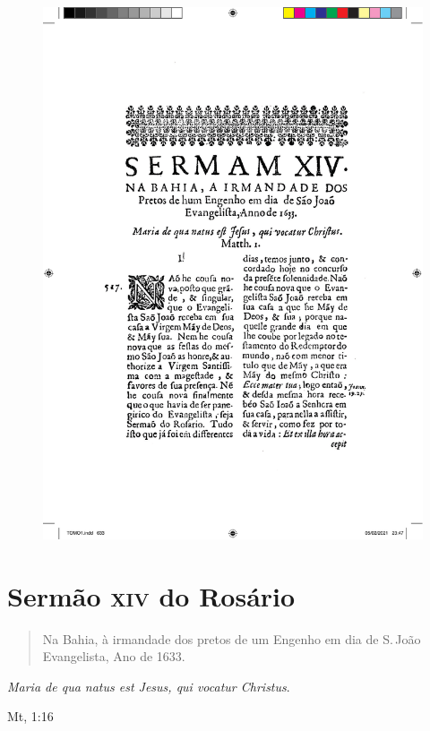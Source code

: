 \pagebreak
\thispagestyle{empty}
\movetoevenpage
\begin{figure}
\includegraphics[width=\textwidth]{./imgs/rosa.pdf}  
\end{figure}

\chapter{Sermão \textsc{xiv} do Rosário}

\begin{quotation}
\noindent{}Na Bahia, à irmandade dos pretos de um Engenho
em dia de S.\,João Evangelista, Ano de 1633.
\end{quotation}

\epigraph{\emph{Maria de qua natus est Jesus, qui vocatur Christus}.}{Mt, 1:16\footnotemark}

